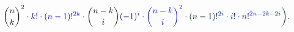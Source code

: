 \documentclass[12pt]{article}
\begin{document}
\makeatletter
\renewcommand*{\@textcolor}[3]{%
  \protect\leavevmode
  \begingroup
    \color#1{#2}#3%
  \endgroup
}
\makeatother
\begin{displaymath}
\mathcolor[RGB]{0,0,15}{\binom { \mathcolor[RGB]{0,0,30}{n} } { \mathcolor[RGB]{0,0,45}{k} } } ^ { \mathcolor[RGB]{0,0,60}{2} } \mathcolor[RGB]{0,0,75}{\cdot} \mathcolor[RGB]{0,0,90}{k} \mathcolor[RGB]{0,0,105}{!} \mathcolor[RGB]{0,0,120}{\cdot} \mathcolor[RGB]{0,0,135}{(} \mathcolor[RGB]{0,0,150}{n} \mathcolor[RGB]{0,0,165}{-} \mathcolor[RGB]{0,0,180}{1} \mathcolor[RGB]{0,0,195}{)} \mathcolor[RGB]{0,0,210}{!} ^ { \mathcolor[RGB]{0,0,225}{2} \mathcolor[RGB]{0,0,240}{k} } \mathcolor[RGB]{0,0,255}{\cdot} \mathcolor[RGB]{0,15,0}{\binom { \mathcolor[RGB]{0,15,15}{n} \mathcolor[RGB]{0,15,30}{-} \mathcolor[RGB]{0,15,45}{k} } { \mathcolor[RGB]{0,15,60}{i} } } \mathcolor[RGB]{0,15,75}{(} \mathcolor[RGB]{0,15,90}{-} \mathcolor[RGB]{0,15,105}{1} \mathcolor[RGB]{0,15,120}{)} ^ { \mathcolor[RGB]{0,15,135}{i} } \mathcolor[RGB]{0,15,150}{\cdot} \mathcolor[RGB]{0,15,165}{\binom { \mathcolor[RGB]{0,15,180}{n} \mathcolor[RGB]{0,15,195}{-} \mathcolor[RGB]{0,15,210}{k} } { \mathcolor[RGB]{0,15,225}{i} } } ^ { \mathcolor[RGB]{0,15,240}{2} } \mathcolor[RGB]{0,15,255}{\cdot} \mathcolor[RGB]{0,30,0}{(} \mathcolor[RGB]{0,30,15}{n} \mathcolor[RGB]{0,30,30}{-} \mathcolor[RGB]{0,30,45}{1} \mathcolor[RGB]{0,30,60}{)} \mathcolor[RGB]{0,30,75}{!} ^ { \mathcolor[RGB]{0,30,90}{2} \mathcolor[RGB]{0,30,105}{i} } \mathcolor[RGB]{0,30,120}{\cdot} \mathcolor[RGB]{0,30,135}{i} \mathcolor[RGB]{0,30,150}{!} \mathcolor[RGB]{0,30,165}{\cdot} \mathcolor[RGB]{0,30,180}{n} \mathcolor[RGB]{0,30,195}{!} ^ { \mathcolor[RGB]{0,30,210}{2} \mathcolor[RGB]{0,30,225}{n} \mathcolor[RGB]{0,30,240}{-} \mathcolor[RGB]{0,30,255}{2} \mathcolor[RGB]{0,45,0}{k} \mathcolor[RGB]{0,45,15}{-} \mathcolor[RGB]{0,45,30}{2} \mathcolor[RGB]{0,45,45}{i} } \mathcolor[RGB]{0,45,60}{\bigg)} \mathcolor[RGB]{0,45,75}{.}
\end{displaymath}
\end{document}
